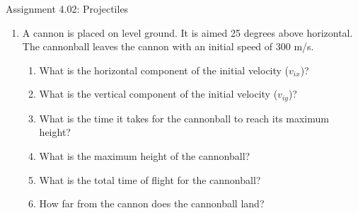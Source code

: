 \documentclass[letterpaper, 12pt]{article}
\begin{document}


\begin{center} Assignment 4.02: Projectiles
\end{center}





\begin{enumerate}

\item A cannon is placed on level ground.  It is aimed 25 degrees above horizontal.   The cannonball leaves the cannon with an initial speed of 300 m/s.  
\begin{enumerate}
	\item What is the horizontal component of the initial velocity ($v_{ix}$)?
	\vspace{0.5in}
	\item What is the vertical component of the initial velocity ($v_{iy}$)?
	\vspace{0.5in}
	\item What is the time it takes for the cannonball to reach its maximum height?	
	\vspace{0.5in}
	\item What is the maximum height of the cannonball?
	\vspace{0.5in}
	\item What is the total time of flight for the cannonball?
	\vspace{0.5in}
	\item How far from the cannon does the cannonball land? 
		\vspace{0.5in}
\end{enumerate}


\end{enumerate}
\end{document}
